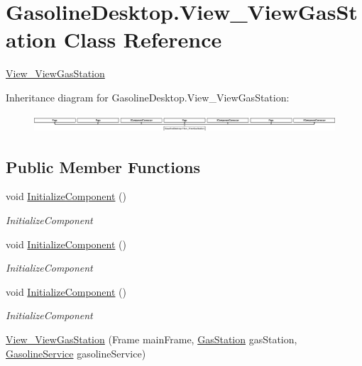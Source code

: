 \hypertarget{class_gasoline_desktop_1_1_view___view_gas_station}{}\section{Gasoline\+Desktop.\+View\+\_\+\+View\+Gas\+Station Class Reference}
\label{class_gasoline_desktop_1_1_view___view_gas_station}


\mbox{\hyperlink{class_gasoline_desktop_1_1_view___view_gas_station}{View\+\_\+\+View\+Gas\+Station}}  


Inheritance diagram for Gasoline\+Desktop.\+View\+\_\+\+View\+Gas\+Station\+:\begin{figure}[H]
\begin{center}
\leavevmode
\includegraphics[height=0.663900cm]{class_gasoline_desktop_1_1_view___view_gas_station}
\end{center}
\end{figure}
\subsection*{Public Member Functions}
\begin{DoxyCompactItemize}
\item 
void \mbox{\hyperlink{class_gasoline_desktop_1_1_view___view_gas_station_ad96db5524ba844cefe83a317117ad1bd}{Initialize\+Component}} ()
\begin{DoxyCompactList}\small\item\em Initialize\+Component \end{DoxyCompactList}\item 
void \mbox{\hyperlink{class_gasoline_desktop_1_1_view___view_gas_station_ad96db5524ba844cefe83a317117ad1bd}{Initialize\+Component}} ()
\begin{DoxyCompactList}\small\item\em Initialize\+Component \end{DoxyCompactList}\item 
void \mbox{\hyperlink{class_gasoline_desktop_1_1_view___view_gas_station_ad96db5524ba844cefe83a317117ad1bd}{Initialize\+Component}} ()
\begin{DoxyCompactList}\small\item\em Initialize\+Component \end{DoxyCompactList}\item 
\mbox{\hyperlink{class_gasoline_desktop_1_1_view___view_gas_station_a3755a37ebae09d9e56d9f005176e6c3e}{View\+\_\+\+View\+Gas\+Station}} (Frame main\+Frame, \mbox{\hyperlink{class_gasoline_desktop_1_1_gas_station}{Gas\+Station}} gas\+Station, \mbox{\hyperlink{class_gasoline_desktop_1_1_gasoline_service}{Gasoline\+Service}} gasoline\+Service)
\end{DoxyCompactItemize}


